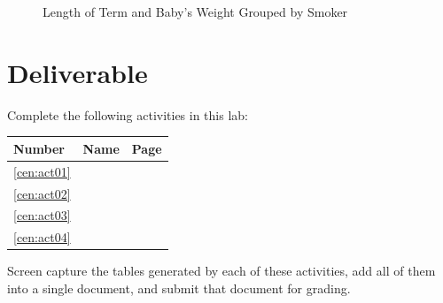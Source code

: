 \begin{figure}[H]
  \begin{center}
    \caption{Length of Term and Baby's Weight Grouped by Smoker}
  \end{center}
\end{figure}

\section{Deliverable}

Complete the following activities in this lab:

\begin{center}
  \begin{tabular}{lll}
    \hline 
    \textbf{Number} & \textbf{Name} & \textbf{Page} \\ 
    \hline 
    \ref{cen:act01} & \nameref{cen:act01} & \pageref{cen:act01} \\ 
    \ref{cen:act02} & \nameref{cen:act02} & \pageref{cen:act02} \\ 
    \ref{cen:act03} & \nameref{cen:act03} & \pageref{cen:act03} \\ 
    \ref{cen:act04} & \nameref{cen:act04} & \pageref{cen:act04} \\ 
    \hline 
  \end{tabular} 
\end{center}

Screen capture the tables generated by each of these activities, add all of them into a single document, and submit that document for grading.